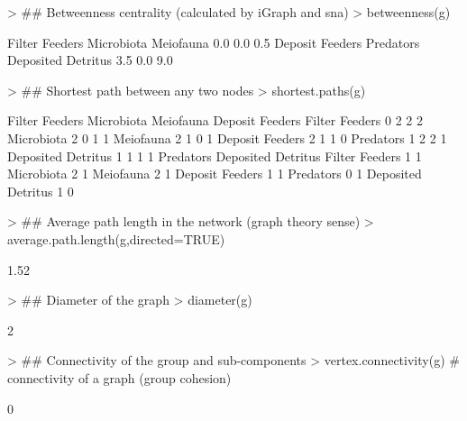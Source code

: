 \documentclass[article]{jss}
\begin{document}
\begin{Schunk}
\begin{Sinput}
> ## Betweenness centrality (calculated by iGraph and sna)
> betweenness(g)
\end{Sinput}
\begin{Soutput}
    Filter Feeders         Microbiota          Meiofauna 
               0.0                0.0                0.5 
   Deposit Feeders          Predators Deposited Detritus 
               3.5                0.0                9.0 
\end{Soutput}
\begin{Sinput}
> ## Shortest path between any two nodes
> shortest.paths(g)
\end{Sinput}
\begin{Soutput}
                   Filter Feeders Microbiota Meiofauna Deposit Feeders
Filter Feeders                  0          2         2               2
Microbiota                      2          0         1               1
Meiofauna                       2          1         0               1
Deposit Feeders                 2          1         1               0
Predators                       1          2         2               1
Deposited Detritus              1          1         1               1
                   Predators Deposited Detritus
Filter Feeders             1                  1
Microbiota                 2                  1
Meiofauna                  2                  1
Deposit Feeders            1                  1
Predators                  0                  1
Deposited Detritus         1                  0
\end{Soutput}
\begin{Sinput}
> ## Average path length in the network (graph theory sense)
> average.path.length(g,directed=TRUE)
\end{Sinput}
\begin{Soutput}
[1] 1.52
\end{Soutput}
\begin{Sinput}
> ## Diameter of the graph
> diameter(g)
\end{Sinput}
\begin{Soutput}
[1] 2
\end{Soutput}
\begin{Sinput}
> ## Connectivity of the group and sub-components
> vertex.connectivity(g)  # connectivity of a graph (group cohesion)
\end{Sinput}
\begin{Soutput}
[1] 0
\end{Soutput}

\end{Schunk}
\end{document}
